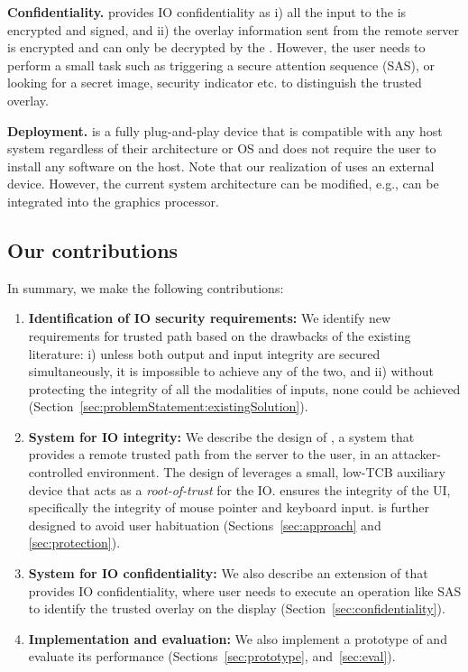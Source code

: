 \textbf{Confidentiality.} \name provides IO confidentiality as i) all the input to the \device is encrypted and signed, and ii) the overlay information sent from the remote server is encrypted and can only be decrypted by the \device. However, the user needs to perform a small task such as triggering a secure attention sequence (SAS), or looking for a secret image, security indicator etc. to distinguish the trusted overlay.


\textbf{Deployment.} \device is a fully plug-and-play device that is compatible with any host system regardless of their architecture or OS and does not require the user to install any software on the host. Note that our realization of \name uses an external device. However, the current system architecture can be modified, e.g., \device can be integrated into the graphics processor. 

\subsection{Our contributions} In summary, we make the following contributions:


\begin{enumerate}
  \item \textbf{Identification of IO security requirements:} We identify new requirements for trusted path based on the drawbacks of the existing literature: i) unless both output and input integrity are secured simultaneously, it is impossible to achieve any of the two, and ii) without protecting the integrity of all the modalities of inputs, none could be achieved (Section~\ref{sec:problemStatement:existingSolution}).
  
   
  \item \textbf{System for IO integrity:} We describe the design of \name, a system that provides a remote trusted path from the server to the user, in an attacker-controlled environment. The design of \name leverages a small, low-TCB auxiliary device that acts as a \emph{root-of-trust} for the IO. \name ensures the integrity of the UI, specifically the integrity of mouse pointer and keyboard input. \name is further designed to avoid user habituation (Sections~\ref{sec:approach} and \ref{sec:protection}).
  
  \item \textbf{System for IO confidentiality:} We also describe an extension of \name that provides IO confidentiality, where user needs to execute an operation like SAS to identify the trusted overlay on the display (Section~\ref{sec:confidentiality}).
  
   
  \item \textbf{Implementation and evaluation:} We also implement a prototype of \name and evaluate its performance (Sections~\ref{sec:prototype}, and~\ref{sec:eval}).
\end{enumerate}


